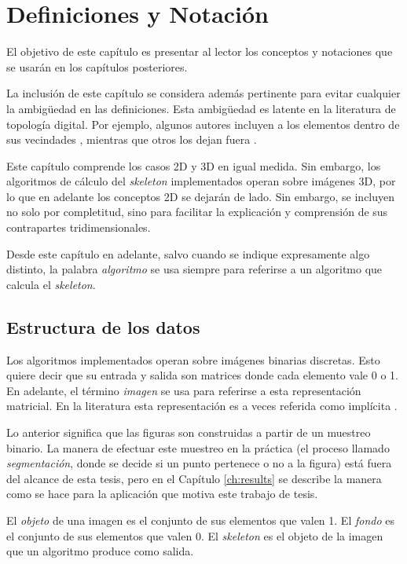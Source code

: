 \chapter{Definiciones y Notación}
\label{ch:defs}

El objetivo de este capítulo es presentar al lector los conceptos y notaciones que se usarán en los capítulos posteriores.

La inclusión de este capítulo se considera además pertinente para evitar cualquier la ambigüedad en las definiciones. Esta ambigüedad es latente en la literatura de topología digital. Por ejemplo, algunos autores incluyen a los elementos dentro de sus vecindades \cite{cornea2007curve}, mientras que otros los dejan fuera \cite{lam1992thinning}.

Este capítulo comprende los casos 2D y 3D en igual medida. Sin embargo, los algoritmos de cálculo del \textit{skeleton} implementados operan sobre imágenes 3D, por lo que en adelante los conceptos 2D se dejarán de lado. Sin embargo, se incluyen no solo por completitud, sino para facilitar la explicación y comprensión de sus contrapartes tridimensionales.

Desde este capítulo en adelante, salvo cuando se indique expresamente algo distinto, la palabra \textit{algoritmo} se usa siempre para referirse a un algoritmo que calcula el \textit{skeleton}.

\section{Estructura de los datos}

Los algoritmos implementados operan sobre imágenes binarias discretas. Esto quiere decir que su entrada y salida son matrices donde cada elemento vale 0 o 1. En adelante, el término \textit{imagen} se usa para referirse a esta representación matricial. En la literatura esta representación es a veces referida como implícita \cite{bloomenthal1997introduction}. 

Lo anterior significa que las figuras son construidas a partir de un muestreo binario. La manera de efectuar este muestreo en la práctica (el proceso llamado \textit{segmentación}, donde se decide si un punto pertenece o no a la figura) está fuera del alcance de esta tesis, pero en el Capítulo \ref{ch:results} se describe la manera como se hace para la aplicación que motiva este trabajo de tesis.

El \textit{objeto} de una imagen es el conjunto de sus elementos que valen 1. El \textit{fondo} es el conjunto de sus elementos que valen 0. El \textit{skeleton} es el objeto de la imagen que un algoritmo produce como salida.

